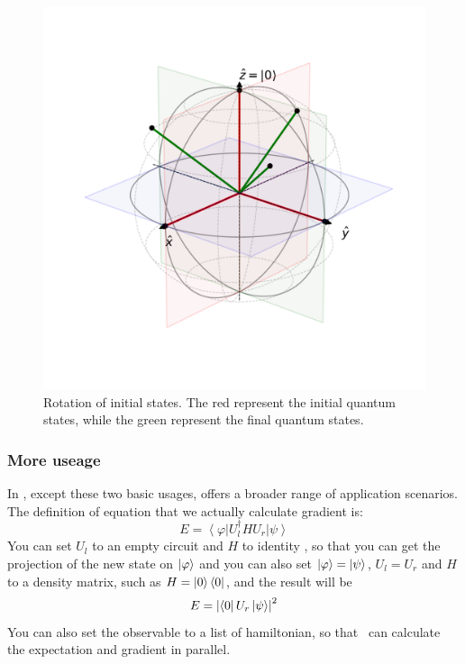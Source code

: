 \begin{figure}[ht]
  \centering
  \includegraphics[scale=0.48]{./images/3_1_result.pdf}
  \caption{\label{3_1_vqa} Rotation of initial states. The red represent the initial quantum states, while the green represent the final quantum states.}
\end{figure}

\subsubsection{More useage}
In \MindQuantum, except these two basic usages, \getexpectationwithgrad offers a broader range of application scenarios. The definition of equation that we actually calculate gradient is:
\begin{equation}
  E = \left<\varphi\right|U_l^\dagger H U_r \left|\psi\right>
\end{equation}
You can set $U_l$ to an empty circuit and $H$ to identity \QubitOperator, so that you can get the projection of the new state on $\ket{\varphi}$ and you can also set $\ket{\varphi}=\ket{\psi}$, $U_l = U_r$ and $H$ to a density matrix, such as $H = \ket{0}\bra{0}$, and the result will be
\begin{equation}
  E=\left|\bra{0}U_r\ket{\psi}\right|^2
\end{equation}
You can also set the observable to a list of hamiltonian, so that \MindQuantum\ can calculate the expectation and gradient in parallel.
